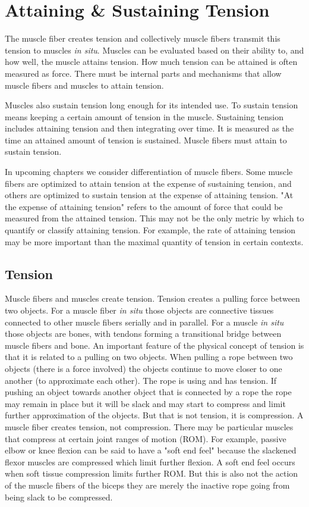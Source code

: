 \section{Attaining \& Sustaining Tension}

The muscle fiber creates tension and collectively muscle fibers transmit this tension to muscles \textit{in situ}. Muscles can be evaluated based on their ability to, and how well, the muscle attains tension. How much tension can be attained is often measured as force. There must be internal parts and mechanisms that allow muscle fibers and muscles to attain tension. 

Muscles also sustain tension long enough for its intended use. To sustain tension means keeping a certain amount of tension in the muscle. Sustaining tension includes attaining tension and then integrating over time. It is measured as the time an attained amount of tension is sustained. Muscle fibers must attain to sustain tension.

In upcoming chapters we consider differentiation of muscle fibers. Some muscle fibers are optimized to attain tension at the expense of sustaining tension, and others are optimized to sustain tension at the expense of attaining tension. "At the expense of attaining tension" refers to the amount of force that could be measured from the attained tension. This may not be the only metric by which to quantify or classify attaining tension. For example, the rate of attaining tension may be more important than the maximal quantity of tension in certain contexts.

\subsection{Tension}

Muscle fibers and muscles create tension. Tension creates a pulling force between two objects. For a muscle fiber \textit{in situ} those objects are connective tissues connected to other muscle fibers serially and in parallel. For a muscle \textit{in situ} those objects are bones, with tendons forming a transitional bridge between muscle fibers and bone. An important feature of the physical concept of tension is that it is related to a pulling on two objects. When pulling a rope between two objects (there is a force involved) the objects continue to move closer to one another (to approximate each other). The rope is using and has tension. If pushing an object towards another object that is connected by a rope the rope may remain in place but it will be slack and may start to compress and limit further approximation of the objects. But that is not tension, it is compression. A muscle fiber creates tension, not compression. There may be particular muscles that compress at certain joint ranges of motion (ROM). For example, passive elbow or knee flexion can be said to have a "soft end feel" because the slackened flexor muscles are compressed which limit further flexion. A soft end feel occurs when soft tissue compression limits further ROM. But this is also not the action of the muscle fibers of the biceps they are merely the inactive rope going from being slack to be compressed.

